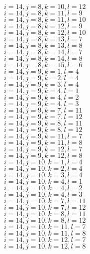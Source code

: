 \documentclass[14pt]{article}
\begin{document}
    $i=14,j=8,k=10,l=12 $ \\ 
    $i=14,j=8,k=11,l=9 $ \\ 
    $i=14,j=8,k=11,l=10 $ \\ 
    $i=14,j=8,k=12,l=9 $ \\ 
    $i=14,j=8,k=12,l=10 $ \\ 
    $i=14,j=8,k=13,l=7 $ \\ 
    $i=14,j=8,k=13,l=8 $ \\ 
    $i=14,j=8,k=14,l=7 $ \\ 
    $i=14,j=8,k=14,l=8 $ \\ 
    $i=14,j=8,k=15,l=6 $ \\ 
    $i=14,j=9,k=1,l=4 $ \\ 
    $i=14,j=9,k=2,l=4 $ \\ 
    $i=14,j=9,k=3,l=4 $ \\ 
    $i=14,j=9,k=4,l=1 $ \\ 
    $i=14,j=9,k=4,l=2 $ \\ 
    $i=14,j=9,k=4,l=3 $ \\ 
    $i=14,j=9,k=7,l=11 $ \\ 
    $i=14,j=9,k=7,l=12 $ \\ 
    $i=14,j=9,k=8,l=11 $ \\ 
    $i=14,j=9,k=8,l=12 $ \\ 
    $i=14,j=9,k=11,l=7 $ \\ 
    $i=14,j=9,k=11,l=8 $ \\ 
    $i=14,j=9,k=12,l=7 $ \\ 
    $i=14,j=9,k=12,l=8 $ \\ 
    $i=14,j=10,k=1,l=4 $ \\ 
    $i=14,j=10,k=2,l=4 $ \\ 
    $i=14,j=10,k=3,l=4 $ \\ 
    $i=14,j=10,k=4,l=1 $ \\ 
    $i=14,j=10,k=4,l=2 $ \\ 
    $i=14,j=10,k=4,l=3 $ \\ 
    $i=14,j=10,k=7,l=11 $ \\ 
    $i=14,j=10,k=7,l=12 $ \\ 
    $i=14,j=10,k=8,l=11 $ \\ 
    $i=14,j=10,k=8,l=12 $ \\ 
    $i=14,j=10,k=11,l=7 $ \\ 
    $i=14,j=10,k=11,l=8 $ \\ 
    $i=14,j=10,k=12,l=7 $ \\ 
    $i=14,j=10,k=12,l=8 $ \\ 
\end{document}
